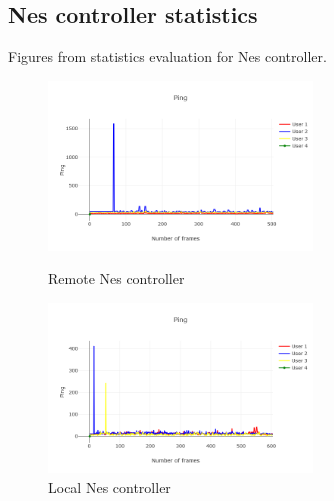 \documentclass{l4proj}
\begin{document}
\begin{appendices}
\pagebreak
\section{Nes controller statistics}
Figures from statistics evaluation for Nes controller. 
\begin{figure}[h!]
    \centering
    \begin{minipage}{0.45\textwidth}
        \centering
        \includegraphics[width=7cm]{./images/rnessping.png} %
        \caption{Remote Nes controller}
        \label{rnesping}
    \end{minipage}\hfill
    \begin{minipage}{0.45\textwidth}
        \centering
        \includegraphics[width=7cm]{./images/lnessping.png} %
        \caption{Local Nes controller}
        \label{lnesping}
    \end{minipage}
\end{figure}


\end{appendices}
\end{document}
